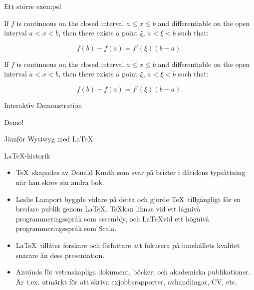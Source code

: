 \begin{Slide}{Ett större exempel}

\begin{exlatex}
If $f$ is continuous on the closed interval $a \leq x \leq b$ 
and differentiable on the open interval $a < x < b$, then there 
exists a point $\xi$, $a < \xi < b$ such that:

\begin{displaymath}
  f(b) - f(a) = f'(\xi)(b - a).
\end{displaymath}

\end{exlatex}
\pause

\vspace{2em}

If $f$ is continuous on the closed interval $a \leq x \leq b$ 
and differentiable on the open interval $a < x < b$, then there 
exists a point $\xi$, $a < \xi < b$ such that:

\begin{displaymath}
  f(b) - f(a) = f'(\xi)(b - a).
\end{displaymath}


\end{Slide}

\begin{Slide}{Interaktiv Demonstration}

  \begin{center}
    \Huge Demo!

    \bigskip
    \Large Jämför {\sc Wysiwyg} med \LaTeX
  \end{center}

\end{Slide}

\begin{Slide}{\LaTeX-historik}
  \begin{itemize}
    \item \TeX\ skapades av Donald Knuth som svar på brister i dåtidens typsättning när han skrev sin andra bok.
    \item Leslie Lamport byggde vidare på detta och gjorde \TeX\ tillgängligt för en bredare publik genom \LaTeX.
      \TeX kan liknas vid ett lågnivå programmeringsspråk som assembly, och \LaTeX vid ett högnivå programmeringsspråk som Scala.
    \item \LaTeX\ tillåter forskare och författare att fokusera på innehållets kvalitet snarare än dess presentation.
    \item Används för vetenskapliga dokument, böcker, och akademiska publikationer. Är t.ex. utmärkt för att skriva exjobbsrapporter, avhandlingar, CV, etc.
  \end{itemize}
\end{Slide}

